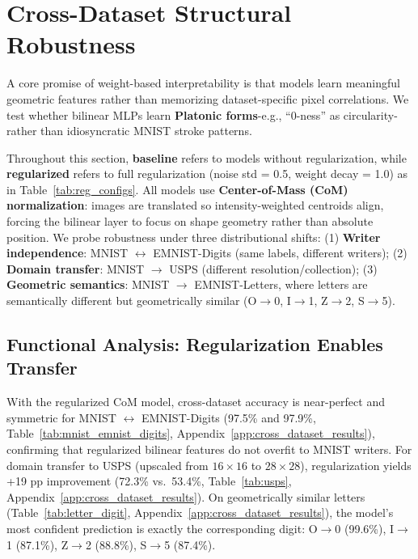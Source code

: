 
\section{Cross-Dataset Structural Robustness}
\label{sec:cross_dataset_robustness}

A core promise of weight-based interpretability is that models learn meaningful geometric features rather than memorizing dataset-specific pixel correlations.
We test whether bilinear MLPs learn \textbf{Platonic forms}-e.g., ``0-ness'' as circularity-rather than idiosyncratic MNIST stroke patterns.

Throughout this section, \textbf{baseline} refers to models without regularization, while \textbf{regularized} refers to full regularization (noise std = 0.5, weight decay = 1.0) as in Table~\ref{tab:reg_configs}.
All models use \textbf{Center-of-Mass (CoM) normalization}: images are translated so intensity-weighted centroids align, forcing the bilinear layer to focus on shape geometry rather than absolute position.
We probe robustness under three distributional shifts:
(1) \textbf{Writer independence}: MNIST $\leftrightarrow$ EMNIST-Digits (same labels, different writers);
(2) \textbf{Domain transfer}: MNIST $\rightarrow$ USPS (different resolution/collection);
(3) \textbf{Geometric semantics}: MNIST $\rightarrow$ EMNIST-Letters, where letters are semantically different but geometrically similar (O$\to$0, I$\to$1, Z$\to$2, S$\to$5).

\subsection{Functional Analysis: Regularization Enables Transfer}

With the regularized CoM model, cross-dataset accuracy is near-perfect and symmetric for MNIST $\leftrightarrow$ EMNIST-Digits (97.5\% and 97.9\%, Table~\ref{tab:mnist_emnist_digits}, Appendix~\ref{app:cross_dataset_results}), confirming that regularized bilinear features do not overfit to MNIST writers.
For domain transfer to USPS (upscaled from $16 \times 16$ to $28 \times 28$), regularization yields +19 pp improvement (72.3\% vs.\ 53.4\%, Table~\ref{tab:usps}, Appendix~\ref{app:cross_dataset_results}).
On geometrically similar letters (Table~\ref{tab:letter_digit}, Appendix~\ref{app:cross_dataset_results}), the model's most confident prediction is exactly the corresponding digit: O$\to$0 (99.6\%), I$\to$1 (87.1\%), Z$\to$2 (88.8\%), S$\to$5 (87.4\%).

